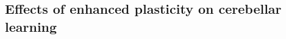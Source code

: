 \documentclass[final]{beamer}%
\begin{document}

\subsection{Effects of enhanced plasticity on cerebellar learning}


%
%
%

\end{document}
